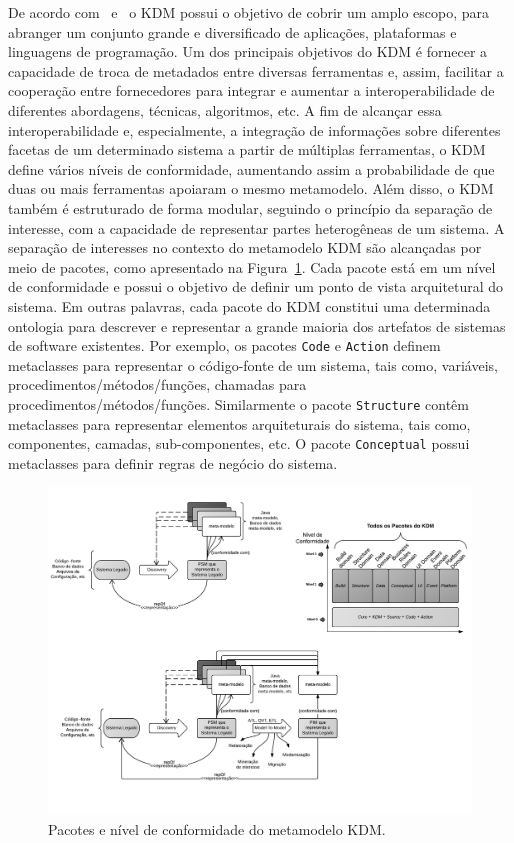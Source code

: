 De acordo com~ e~ o KDM possui o objetivo de cobrir um amplo escopo, para abranger um conjunto grande e diversificado de aplicações, plataformas e linguagens de programação. Um dos principais objetivos do KDM é fornecer a capacidade de troca de metadados entre diversas ferramentas e, assim, facilitar a cooperação entre fornecedores para integrar e aumentar a interoperabilidade de diferentes abordagens, técnicas, algoritmos, etc. A fim de alcançar essa interoperabilidade e, especialmente, a integração de informações sobre diferentes facetas de um determinado sistema a partir de múltiplas ferramentas, o KDM define vários níveis de conformidade, aumentando assim a probabilidade de que duas ou mais ferramentas apoiaram o mesmo metamodelo. Além disso, o KDM também é estruturado de forma modular, seguindo o princípio da separação de interesse, com a capacidade de representar partes heterogêneas de um sistema. A separação de interesses no contexto do metamodelo KDM são alcançadas por meio de pacotes, como apresentado na Figura~\ref{kdm:domain}. Cada pacote está em um nível de conformidade e possui o objetivo de definir um ponto de vista arquitetural do sistema. Em outras palavras, cada pacote do KDM constitui uma determinada ontologia para descrever e representar a grande maioria dos artefatos de sistemas de software existentes. Por exemplo, os pacotes \texttt{Code} e \texttt{Action} definem metaclasses para representar o código-fonte de um sistema, tais como, variáveis, procedimentos/métodos/funções, chamadas para procedimentos/métodos/funções. Similarmente o pacote \texttt{Structure} contêm metaclasses para representar elementos arquiteturais do sistema, tais como, componentes, camadas, sub-componentes, etc. O pacote \texttt{Conceptual} possui  metaclasses para definir regras de negócio do sistema.


\begin{figure}[htb]
 \caption{Pacotes e nível de conformidade do metamodelo KDM.}
 \label{kdm:domain}
 \centering
 \includegraphics[scale=1]{images/kdmLevels_pacotes.pdf}
\end{figure}

